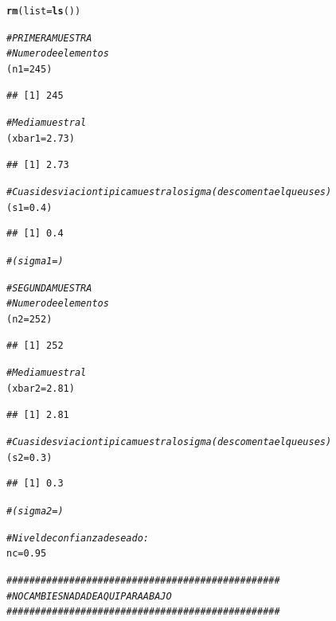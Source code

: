 \documentclass[10pt,a4paper]{article}\usepackage[]{graphicx}\usepackage[]{color}
\makeatletter
\newcommand{\hlnum}[1]{\textcolor[rgb]{0.686,0.059,0.569}{#1}}%
\newcommand{\hlcom}[1]{\textcolor[rgb]{0.678,0.584,0.686}{\textit{#1}}}%
\newcommand{\hlstd}[1]{\textcolor[rgb]{0.345,0.345,0.345}{#1}}%
\newcommand{\hlkwb}[1]{\textcolor[rgb]{0.69,0.353,0.396}{#1}}%
\newcommand{\hlkwc}[1]{\textcolor[rgb]{0.333,0.667,0.333}{#1}}%
\newcommand{\hlkwd}[1]{\textcolor[rgb]{0.737,0.353,0.396}{\textbf{#1}}}%
\newenvironment{kframe}{%
 \def\at@end@of@kframe{}%
 \ifinner\ifhmode%
  \def\at@end@of@kframe{\end{minipage}}%
  \begin{minipage}{\columnwidth}%
 \fi\fi%
 \def\FrameCommand##1{\hskip\@totalleftmargin \hskip-\fboxsep
 \colorbox{shadecolor}{##1}\hskip-\fboxsep
     \hskip-\linewidth \hskip-\@totalleftmargin \hskip\columnwidth}%
 \MakeFramed {\advance\hsize-\width
   \@totalleftmargin\z@ \linewidth\hsize
   \@setminipage}}%
 {\par\unskip\endMakeFramed%
 \at@end@of@kframe}
\newenvironment{knitrout}{}{} %
\makeatother
\begin{document}
{\begin{enumerate}
\begin{knitrout}
\begin{kframe}
\begin{alltt}
    \hlkwd{rm}\hlstd{(}\hlkwc{list}\hlstd{=}\hlkwd{ls}\hlstd{())}

    \hlcom{# PRIMERA MUESTRA}
    \hlcom{# Numero de elementos}
    \hlstd{(n1} \hlkwb{=} \hlnum{245}\hlstd{)}
\end{alltt}
\begin{verbatim}
## [1] 245
\end{verbatim}
\begin{alltt}
    \hlcom{# Media muestral}
    \hlstd{(xbar1} \hlkwb{=} \hlnum{2.73}\hlstd{)}
\end{alltt}
\begin{verbatim}
## [1] 2.73
\end{verbatim}
\begin{alltt}
    \hlcom{# Cuasidesviacion tipica muestral o sigma (descomenta el que uses)}
    \hlstd{(s1} \hlkwb{=} \hlnum{0.4}\hlstd{)}
\end{alltt}
\begin{verbatim}
## [1] 0.4
\end{verbatim}
\begin{alltt}
    \hlcom{#(sigma1 = )}


    \hlcom{# SEGUNDA MUESTRA}
    \hlcom{# Numero de elementos}
    \hlstd{(n2} \hlkwb{=} \hlnum{252}\hlstd{)}
\end{alltt}
\begin{verbatim}
## [1] 252
\end{verbatim}
\begin{alltt}
    \hlcom{# Media muestral}
    \hlstd{(xbar2} \hlkwb{=} \hlnum{2.81}\hlstd{)}
\end{alltt}
\begin{verbatim}
## [1] 2.81
\end{verbatim}
\begin{alltt}
    \hlcom{# Cuasidesviacion tipica muestral o sigma (descomenta el que uses)}
    \hlstd{(s2} \hlkwb{=} \hlnum{0.3}\hlstd{)}
\end{alltt}
\begin{verbatim}
## [1] 0.3
\end{verbatim}
\begin{alltt}
    \hlcom{#(sigma2 = )}

    \hlcom{# Nivel de confianza deseado:}
    \hlstd{nc} \hlkwb{=} \hlnum{0.95}

    \hlcom{################################################}
    \hlcom{#NO CAMBIES NADA DE AQUI PARA ABAJO}
    \hlcom{################################################}


\end{alltt}
\end{kframe}
\end{knitrout}
\end{enumerate}}
\end{document}
